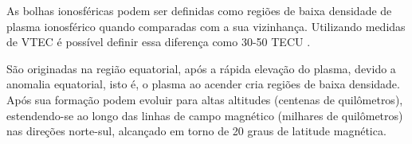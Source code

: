 As bolhas ionosféricas podem ser definidas como regiões de baixa densidade de plasma ionosférico quando comparadas com a sua vizinhança. Utilizando medidas de VTEC é possível definir essa diferença como 30-50 TECU \cite{TAKAHASHI:2006}.

São originadas na região equatorial, após a rápida elevação do plasma, devido a anomalia equatorial, isto é, o plasma ao acender cria regiões de baixa densidade. Após sua formação podem evoluir para altas altitudes (centenas de quilômetros), estendendo-se ao longo das linhas de campo magnético (milhares de quilômetros) nas direções norte-sul, alcançado em torno de 20 graus de latitude magnética.
